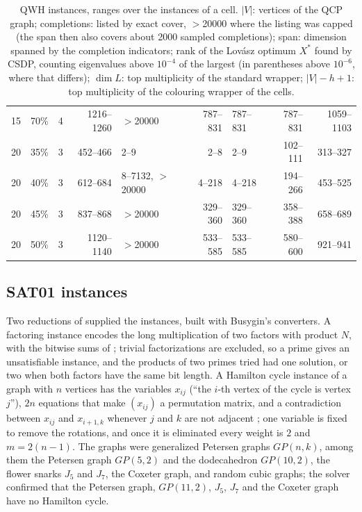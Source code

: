 \documentclass[11pt]{article}
\theoremstyle{definition}
\theoremstyle{remark}
\begin{document}
\begin{table}[ht]
\begin{center}
\begin{tabular}{|r|r|r|r|l|r|l|r|r|}
15 & 70\% & 4 & 1216--1260 & $>$20000 & 787--831 & 787--831 & 787--831 & 1059--1103 \\
20 & 35\% & 3 & 452--466 & 2--9 & 2--8 & 2--9 & 102--111 & 313--327 \\
20 & 40\% & 3 & 612--684 & 8--7132, $>$20000 & 4--218 & 4--218 & 194--266 & 453--525 \\
20 & 45\% & 3 & 837--868 & $>$20000 & 329--360 & 329--360 & 358--388 & 658--689 \\
20 & 50\% & 3 & 1120--1140 & $>$20000 & 533--585 & 533--585 & 580--600 & 921--941 \\
\hline
\end{tabular}
\end{center}
\caption{\label{tab:qwh} QWH instances, ranges over the instances of a cell.
$|V|$: vertices of the QCP graph; completions: listed by exact cover,
$>$20000 where the listing was capped (the span then also covers about 2000
sampled completions); span: dimension spanned by the completion indicators;
rank of the Lov\'asz optimum $X^*$ found by CSDP, counting eigenvalues above
$10^{-4}$ of the largest (in parentheses above $10^{-6}$, where that
differs); $\dim L$: top multiplicity of the standard wrapper; $|V|-h+1$: top
multiplicity of the colouring wrapper of the cells.}
\end{table}

\subsection{SAT01 instances}
\label{sec:sat01comp}

Two reductions of \cite{Bu07} supplied the instances, built with Busygin's
converters. A factoring instance encodes the long multiplication of two
factors with product $N$, with the bitwise sums of
\cite[Section~4.9]{Bu07}; trivial factorizations are excluded, so a prime
gives an unsatisfiable instance, and the products of two primes tried had
one solution, or two when both factors have the same bit length. A Hamilton
cycle instance of a graph with $n$ vertices has the variables $x_{ij}$ (``the
$i$-th vertex of the cycle is vertex $j$''), $2n$ equations that make
$(x_{ij})$ a permutation matrix, and a contradiction between $x_{ij}$ and
$x_{i+1,k}$ whenever $j$ and $k$ are not adjacent \cite[Section~4.2]{Bu07};
one variable is fixed to remove the rotations, and once it is eliminated
every weight is $2$ and $m=2(n-1)$. The graphs were generalized Petersen
graphs $GP(n,k)$, among them the Petersen graph $GP(5,2)$ and the
dodecahedron $GP(10,2)$, the flower snarks $J_5$ and $J_7$, the Coxeter
graph, and random cubic graphs; the solver confirmed that the Petersen
graph, $GP(11,2)$, $J_5$, $J_7$ and the Coxeter graph have no Hamilton cycle.
\end{document}
